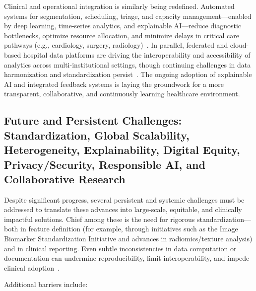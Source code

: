 \documentclass[sigconf]{acmart}
\begin{document}
Clinical and operational integration is similarly being redefined. Automated systems for segmentation, scheduling, triage, and capacity management—enabled by deep learning, time-series analytics, and explainable AI—reduce diagnostic bottlenecks, optimize resource allocation, and minimize delays in critical care pathways (e.g., cardiology, surgery, radiology)~\cite{ref49,ref72,ref73,ref74,ref75,ref76,ref100,ref101}. In parallel, federated and cloud-based hospital data platforms are driving the interoperability and accessibility of analytics across multi-institutional settings, though continuing challenges in data harmonization and standardization persist~\cite{ref88,ref89}. The ongoing adoption of explainable AI and integrated feedback systems is laying the groundwork for a more transparent, collaborative, and continuously learning healthcare environment.

\subsection{Future and Persistent Challenges: Standardization, Global Scalability, Heterogeneity, Explainability, Digital Equity, Privacy/Security, Responsible AI, and Collaborative Research}

Despite significant progress, several persistent and systemic challenges must be addressed to translate these advances into large-scale, equitable, and clinically impactful solutions. Chief among these is the need for rigorous standardization—both in feature definition (for example, through initiatives such as the Image Biomarker Standardization Initiative and advances in radiomics/texture analysis) and in clinical reporting. Even subtle inconsistencies in data computation or documentation can undermine reproducibility, limit interoperability, and impede clinical adoption~\cite{ref5,ref13,ref16,ref17,ref18,ref19,ref20,ref21,ref22,ref23,ref24,ref25,ref28,ref30,ref31,ref32,ref33,ref34,ref35,ref36,ref37,ref38,ref39,ref40,ref41,ref42,ref43,ref44,ref45,ref46,ref47,ref48,ref49,ref50,ref51,ref52,ref53,ref54,ref55,ref56,ref57,ref58,ref59,ref60,ref61,ref62,ref63,ref64,ref65,ref66,ref67,ref68,ref69,ref70,ref71,ref72,ref73,ref74,ref75,ref76,ref77,ref78,ref79,ref80,ref81,ref82,ref83,ref84,ref85,ref86,ref87,ref88,ref89,ref90,ref91,ref92,ref94,ref95,ref96,ref97,ref98,ref99,ref100,ref101,ref102,ref103,ref104,ref105,ref106,ref107}.

Additional barriers include:
\end{document}
